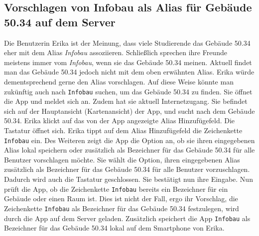 \subsection{Vorschlagen von Infobau als \Gls{Alias} für Gebäude 50.34 auf dem Server}

Die Benutzerin Erika ist der Meinung, dass viele Studierende das Gebäude 50.34 eher mit dem \Gls{Alias} \textit{Infobau} assoziieren.
Schließlich sprechen ihre Freunde meistens immer vom \textit{Infobau}, wenn sie das Gebäude 50.34 meinen.
Aktuell findet man das Gebäude 50.34 jedoch nicht mit dem oben erwähnten \Gls{Alias}.
Erika würde dementsprechend gerne den \Gls{Alias} vorschlagen.
Auf diese Weise könnte man zukünftig auch nach \texttt{Infobau} suchen, um das Gebäude 50.34 zu finden.
Sie öffnet die App und meldet sich an.
Zudem hat sie aktuell Internetzugang.
Sie befindet sich auf der Hauptansicht (\Gls{Kartenansicht}) der App, und sucht nach dem Gebäude 50.34.
Erika klickt auf das von der App angezeigte \Gls{Alias} Hinzufügefeld. 
Die Tastatur öffnet sich.
Erika tippt auf dem \Gls{Alias} Hinzufügefeld die \Gls{Zeichenkette} \texttt{Infobau} ein.
Des Weiteren zeigt die App die Option an, ob sie ihren eingegebenen \Gls{Alias} \gls{lokal} speichern oder zusätzlich als Bezeichner für das Gebäude 50.34 für alle Benutzer vorschlagen möchte.
Sie wählt die Option, ihren eingegebenen \Gls{Alias} zusätzlich als Bezeichner für das Gebäude 50.34 für alle Benutzer vorzuschlagen. 
Dadurch wird auch die Tastatur geschlossen. 
Sie bestätigt nun ihre Eingabe. 
Nun prüft die App, ob die \Gls{Zeichenkette} \texttt{Infobau} bereits ein Bezeichner für ein Gebäude oder einen Raum ist. 
Dies ist nicht der Fall, ergo ihr Vorschlag, die \Gls{Zeichenkette} \texttt{Infobau} als Bezeichner für das Gebäude 50.34 festzulegen, wird durch die App auf dem \Gls{Server} geladen. 
Zusätzlich speichert die App \texttt{Infobau} als Bezeichner für das Gebäude 50.34 \gls{lokal} auf dem Smartphone von Erika.
